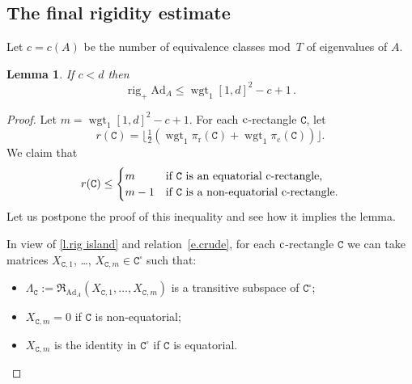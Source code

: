\documentclass[10pt, a4paper]{amsart}
\theoremstyle{plain}
\newtheorem{lemma}{Lemma}[section]
\theoremstyle{definition}
\theoremstyle{remark}
\theoremstyle{note}
\numberwithin{equation}{section}
\begin{document}
\subsection{The final rigidity estimate}

Let $c = c(A)$ be the number of equivalence classes mod~$T$ of eigenvalues of $A$.

\begin{lemma}\label{l.rig world} 
If $c<d$ then
$$
\operatorname{rig}_+ {\mathrm{Ad}}_A \le  \operatorname{wgt}_1 [1,d]^2 - c + 1 \, . 
$$
\end{lemma}

\begin{proof} 
Let $m = \operatorname{wgt}_1 [1,d]^2 - c + 1$.
For each $\rm c$-rectangle ${\mathtt{C}}$, let 
$$
r({\mathtt{C}}) =  \big\lfloor \tfrac{1}{2} (\operatorname{wgt}_1 {\pi_\mathrm{r}}({\mathtt{C}}) + \operatorname{wgt}_1 {\pi_\mathrm{c}}({\mathtt{C}})) \big\rfloor.
$$
We claim that 
\begin{equation}\label{e.crude}
r({\mathtt{C}}) \le 
\begin{cases}
m   &\text{if ${\mathtt{C}}$ is an equatorial $\rm c$-rectangle,} \\
m-1 &\text{if ${\mathtt{C}}$ is a non-equatorial $\rm c$-rectangle.}
\end{cases}
\end{equation}
Let us postpone the proof of this inequality and see how it implies the lemma.

In view of \cref{l.rig island} and relation~\eqref{e.crude},
for each $\rm c$-rectangle ${\mathtt{C}}$ we can take matrices $X_{{\mathtt{C}}, 1}$, \dots, $X_{{\mathtt{C}}, m} \in {\mathtt{C}}^\square$
such that:
\begin{itemize}
\item $\Lambda_{\mathtt{C}} := {\mathfrak{R}}_{{\mathrm{Ad}}_A} (X_{{\mathtt{C}}, 1}, \dots, X_{{\mathtt{C}}, m})$ is a transitive subspace of  ${\mathtt{C}}^\square$;
\item $X_{{\mathtt{C}}, m} = 0$ if ${\mathtt{C}}$ is non-equatorial;
\item $X_{{\mathtt{C}}, m}$ is the identity in ${\mathtt{C}}^\square$ if ${\mathtt{C}}$ is equatorial.
\end{itemize}


\end{proof}
\end{document}
